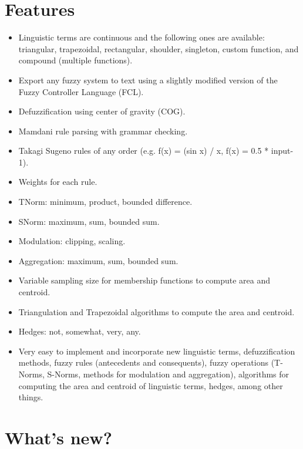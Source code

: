 \section{Features}
\begin{itemize}
	\item Linguistic terms are continuous and the following ones are available: triangular, trapezoidal, rectangular, shoulder, singleton, custom function, and compound (multiple functions).
	\item Export any fuzzy system to text using a slightly modified version of the Fuzzy Controller Language (FCL).
	\item Defuzzification using center of gravity (COG). 
	\item Mamdani rule parsing with grammar checking.
	\item Takagi Sugeno rules of any order (e.g. f(x) = (sin x) / x, f(x) = 0.5 * input-1).
	\item Weights for each rule.
	\item TNorm: minimum, product, bounded difference. 
	\item SNorm: maximum, sum, bounded sum. 
	\item Modulation: clipping, scaling. 
	\item Aggregation: maximum, sum, bounded sum.
	\item Variable sampling size for membership functions to compute area and centroid.
	\item Triangulation and Trapezoidal algorithms to compute the area and
	centroid.
	\item Hedges: not, somewhat, very, any. 
	\item Very easy to implement and incorporate new linguistic terms, defuzzification methods, fuzzy rules (antecedents and consequents), fuzzy operations (T-Norms, S-Norms, methods for modulation and aggregation), algorithms for computing the area and centroid of linguistic terms, hedges, among other things.
	
\end{itemize}

\section{What's new?}

